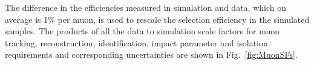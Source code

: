 %		
%		
%		
%		
		
		The difference in the efficiencies measured in simulation and data, which on average is 1\% per muon, is used to rescale the selection efficiency in the simulated samples. The products of all the data to simulation scale factors for muon tracking, reconstruction, identification, impact parameter and isolation requirements and corresponding uncertainties are shown in Fig.~\ref{fig:MuonSFs}.
		
